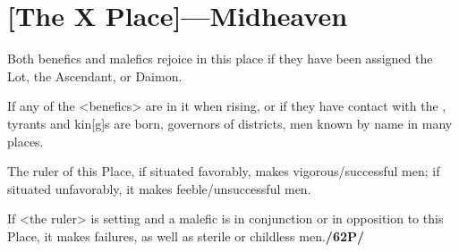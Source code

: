 \section{[The X Place]---Midheaven}
 
Both benefics and malefics rejoice in this place if they have been assigned the Lot, the Ascendant, or Daimon. 

If any of the <benefics> are in it when rising, or if they have contact with the \Moon, tyrants and kin[g]s are born, governors of districts, men known by name in many places. 

The ruler of this Place, if situated favorably, makes vigorous/successful men; if situated unfavorably, it makes feeble/unsuccessful men. 

If <the ruler> is setting and a malefic is in conjunction or in opposition to this Place, it makes failures, as well as sterile or childless men.\textbf{/62P/}

\newpage